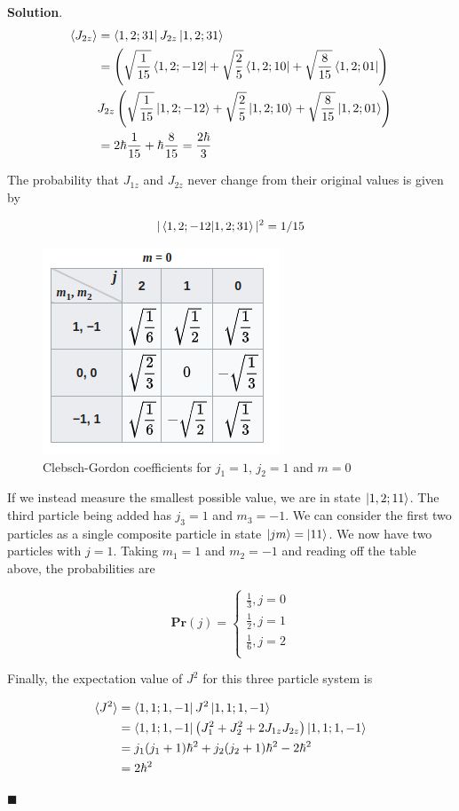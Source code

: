 \documentclass[12pt]{article}
\theoremstyle{definition}
\newenvironment{s}{%
        \begin{trivlist} \item \textbf{Solution}. }{%
            \hspace*{\fill} $\blacksquare$\end{trivlist}}%
\begin{document}
{\begin{s}
\begin{align*}
\langle J_{2z} \rangle &= \bra{1,2;31} J_{2z}  \ket{1,2;31} \\
&= \left(\sqrt{\frac{1}{15}}\bra{1,2;-12} + \sqrt{\frac{2}{5}}\bra{1,2;10} + \sqrt{\frac{8}{15}}\bra{1,2;01}\right)\\
&J_{2z}\left(\sqrt{\frac{1}{15}}\ket{1,2;-12} + \sqrt{\frac{2}{5}}\ket{1,2;10} + \sqrt{\frac{8}{15}}\ket{1,2;01}\right)\\
&= 2\hbar\frac{1}{15} + \hbar\frac{8}{15} = \frac{2\hbar}{3}
\end{align*}

The probability that $J_{1z}$ and $J_{2z}$ never change from their original values is given by 

\begin{align*}
|\bra{1,2;-12}\ket{1,2;31}|^{2} = 1/15
\end{align*}

\begin{figure}
\centering
\includegraphics[scale=0.75]{cb-table-2.png}
\caption{Clebsch-Gordon coefficients for $j_{1} = 1$, $j_{2} = 1$ and $m=0$}
\end{figure}

If we instead measure the smallest possible value, we are in state $\ket{1,2;11}$. The third particle being added has $j_{3} = 1$ and $m_{3} = -1$. We can consider the first two particles as a single composite particle in state $\ket{jm} = \ket{11}$. We now have two particles with $j = 1$. Taking $m_{1} = 1$ and $m_{2} = -1$ and reading off the table above, the probabilities are

$$
\mathbf{Pr}(j)=
\begin{cases}
\frac{1}{3}, j = 0 \\
\frac{1}{2}, j = 1 \\
\frac{1}{6}, j = 2 \\
\end{cases}
$$

Finally, the expectation value of $J^{2}$ for this three particle system is 

\begin{align*}
\langle J^{2} \rangle &= \bra{1,1;1,-1}J^{2}\ket{1,1;1,-1}\\
&= \bra{1,1;1,-1}\left(J_{1}^{2}+J_{2}^{2} + 2J_{1z}J_{2z}\right)\ket{1,1;1,-1}\\
&= j_{1}(j_{1}+1)\hbar^{2} + j_{2}(j_{2}+1)\hbar^{2} - 2\hbar^{2}\\
&= 2\hbar^{2}
\end{align*}

\end{s}
\end{document}
